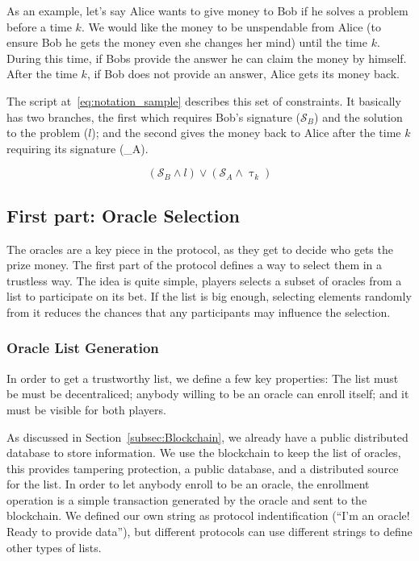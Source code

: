 As an example, let's say Alice wants to give money to Bob if he solves a problem
  before a time $k$.
We would like the money to be unspendable from Alice (to ensure Bob he gets the
  money even she changes her mind) until the time $k$.
During this time, if Bobs provide the answer he can claim the money by himself.
After the time $k$, if Bob does not provide an answer, Alice gets its money
  back.

The script at~\ref{eq:notation_sample} describes this set of constraints.
It basically has two branches, the first which requires Bob's signature
  ($\mathcal{S}_B$) and the solution to the problem ($l$); and the second gives
  the money back to Alice after the time $k$ requiring its signature
  (_A).

\begin{equation} \label{eq:notation_sample}
    (\mathcal{S}_B \wedge l) \vee (\mathcal{S}_A \wedge \uptau_k)
\end{equation}
\mathmode



\subsection{First part: Oracle Selection}

The oracles are a key piece in the protocol, as they get to decide who gets
  the prize money.
The first part of the protocol defines a way to select them in a trustless
  way.
The idea is quite simple, players selects a subset of oracles from a list
  to participate on its bet.
If the list is big enough, selecting elements randomly from it reduces the
  chances that any participants may influence the selection.

\subsubsection{Oracle List Generation}

In order to get a trustworthy list, we define a few key properties:
The list must be must be decentraliced; anybody willing to be an oracle can
  enroll itself; and it must be visible for both players.

As discussed in Section~\ref{subsec:Blockchain}, we already have a public
  distributed database to store information.
We use the blockchain to keep the list of oracles, this provides tampering
  protection, a public database, and a distributed source for the list.
In order to let anybody enroll to be an oracle, the enrollment operation is a
  simple transaction generated by the oracle and sent to the blockchain.
We defined our own string as protocol indentification
(``I'm an oracle! Ready to provide data''), but different protocols
  can use different strings to define other types of lists.

